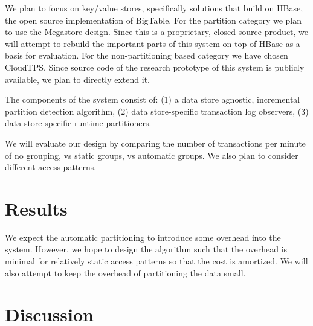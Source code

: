 \documentclass[10pt,final,journal]{IEEEtran}
\begin{document}
We plan to focus on key/value stores, specifically solutions that build on HBase, the open source implementation of BigTable. For the partition category we plan to use the Megastore design. Since this is a proprietary, closed source product, we will attempt to rebuild the important parts of this system on top of HBase as a basis for evaluation. For the non-partitioning based category we have chosen CloudTPS. Since source code of the research prototype of this system is publicly available, we plan to directly extend it.

The components of the system consist of: (1) a data store agnostic, incremental partition detection algorithm, (2) data store-specific transaction log observers, (3) data store-specific runtime partitioners.

We will evaluate our design by comparing the number of transactions per minute of no grouping, vs static groups, vs automatic groups. We also plan to consider different access patterns.

\section{Results}
We expect the automatic partitioning to introduce some overhead into the system. However, we hope to design the algorithm such that the overhead is minimal for relatively static access patterns so that the cost is amortized. We will also attempt to keep the overhead of partitioning the data small.

\section{Discussion}




\end{document}
